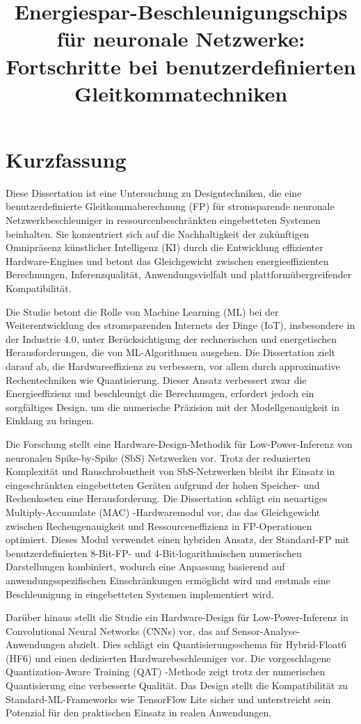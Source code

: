 \documentclass{article}
\title{Energiespar-Beschleunigungschips für neuronale Netzwerke: \\Fortschritte bei benutzerdefinierten Gleitkommatechniken}
\author{}
\date{}
\begin{document}
	
	\maketitle
	
	\section*{Kurzfassung}

	Diese Dissertation ist eine Untersuchung zu Designtechniken, die eine benutzerdefinierte Gleitkommaberechnung (FP) für stromsparende neuronale Netzwerkbeschleuniger in ressourcenbeschränkten eingebetteten Systemen beinhalten. Sie konzentriert sich auf die Nachhaltigkeit der zukünftigen Omnipräsenz künstlicher Intelligenz (KI) durch die Entwicklung effizienter Hardware-Engines und betont das Gleichgewicht zwischen energieeffizienten Berechnungen, Inferenzqualität, Anwendungsvielfalt und plattformübergreifender Kompatibilität.
	
	Die Studie betont die Rolle von Machine Learning (ML) bei der Weiterentwicklung des stromsparenden Internets der Dinge (IoT), insbesondere in der Industrie 4.0, unter Berücksichtigung der rechnerischen und energetischen Herausforderungen, die von ML-Algorithmen ausgehen. Die Dissertation zielt darauf ab, die Hardwareeffizienz zu verbessern, vor allem durch approximative Rechentechniken wie Quantisierung. Dieser Ansatz verbessert zwar die Energieeffizienz und beschleunigt die Berechnungen, erfordert jedoch ein sorgfältiges Design, um die numerische Präzision mit der  Modellgenauigkeit in Einklang zu bringen.
	
	Die Forschung stellt eine Hardware-Design-Methodik für Low-Power-Inferenz von neuronalen Spike-by-Spike (SbS) Netzwerken vor. Trotz der reduzierten Komplexität und Rauschrobustheit von SbS-Netzwerken bleibt ihr Einsatz in eingeschränkten eingebetteten Geräten aufgrund der hohen Speicher- und Rechenkosten eine Herausforderung. Die Dissertation schlägt ein neuartiges Multiply-Accumulate (MAC) -Hardwaremodul vor, das das Gleichgewicht zwischen Rechengenauigkeit und Ressourceneffizienz in FP-Operationen optimiert. Dieses Modul verwendet einen hybriden Ansatz, der Standard-FP mit benutzerdefinierten 8-Bit-FP- und 4-Bit-logarithmischen numerischen Darstellungen kombiniert, wodurch eine Anpassung basierend auf anwendungsspezifischen Einschränkungen ermöglicht wird und erstmals eine Beschleunigung in eingebetteten Systemen implementiert wird.
	
	Darüber hinaus stellt die Studie ein Hardware-Design für Low-Power-Inferenz in Convolutional Neural Networks (CNNs) vor, das auf Sensor-Analyse-Anwendungen abzielt. Dies schlägt ein Quantisierungsschema für Hybrid-Float6 (HF6) und einen dedizierten Hardwarebeschleuniger vor. Die vorgeschlagene Quantization-Aware Training (QAT) -Methode zeigt trotz der numerischen Quantisierung eine verbesserte Qualität. Das Design stellt die Kompatibilität zu Standard-ML-Frameworks wie TensorFlow Lite sicher und unterstreicht sein Potenzial für den praktischen Einsatz in realen Anwendungen.
	
\end{document}
